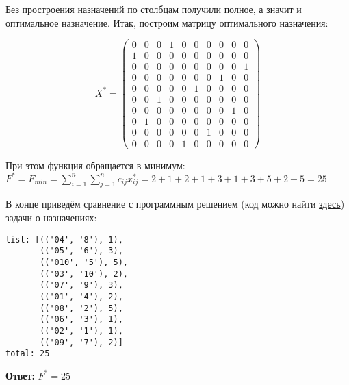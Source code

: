 Без простроения назначений по столбцам получили полное, а значит и оптимальное назначение. Итак, построим матрицу оптимального назначения:

\[
    X^* = \begin{pmatrix}
        0 & 0 & 0 & 1 & 0 & 0 & 0 & 0 & 0 & 0 \\
        1 & 0 & 0 & 0 & 0 & 0 & 0 & 0 & 0 & 0 \\
        0 & 0 & 0 & 0 & 0 & 0 & 0 & 0 & 0 & 1 \\
        0 & 0 & 0 & 0 & 0 & 0 & 0 & 1 & 0 & 0 \\
        0 & 0 & 0 & 0 & 0 & 1 & 0 & 0 & 0 & 0 \\
        0 & 0 & 1 & 0 & 0 & 0 & 0 & 0 & 0 & 0 \\
        0 & 0 & 0 & 0 & 0 & 0 & 0 & 0 & 1 & 0 \\
        0 & 1 & 0 & 0 & 0 & 0 & 0 & 0 & 0 & 0 \\
        0 & 0 & 0 & 0 & 0 & 0 & 1 & 0 & 0 & 0 \\
        0 & 0 & 0 & 0 & 1 & 0 & 0 & 0 & 0 & 0
    \end{pmatrix}
\]

При этом функция обращается в минимум: $F^* = F_{min} = \sum\limits_{i=1}^{n} \sum\limits_{j=1}^{n} c_{ij} x^*_{ij} = 2 + 1 + 2 + 1 + 3 + 1 + 3 + 5 + 2 + 5 = 25$

В конце приведём сравнение с программным решением (код можно найти \href{https://github.com/retrobannerS/optimization_methods/blob/main/python/08-lab/hungarian-algorithm.ipynb}{здесь}) задачи о назначениях:


\begin{lstlisting}[language=text]
list: [(('04', '8'), 1),
       (('05', '6'), 3),
       (('010', '5'), 5),
       (('03', '10'), 2),
       (('07', '9'), 3),
       (('01', '4'), 2),
       (('08', '2'), 5),
       (('06', '3'), 1),
       (('02', '1'), 1),
       (('09', '7'), 2)]
total: 25
\end{lstlisting}

\textbf{Ответ:} $F^* = 25$

\newpage